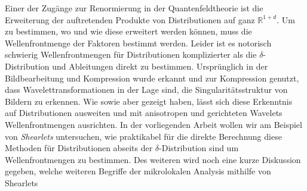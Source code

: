 
Einer der Zugänge zur Renormierung in der Quantenfeldtheorie ist die Erweiterung der auftretenden Produkte von Distributionen auf ganz $\mathbb{R}^{1+d}$. Um zu bestimmen, wo und wie diese erweitert werden können, muss die Wellenfrontmenge der Faktoren bestimmt werden. Leider ist es notorisch schwierig Wellenfrontmengen für Distributionen komplizierter als die $\delta$-Distribution und Ableitungen direkt zu bestimmen.
Ursprünglich in der Bildbearbeitung und Kompression wurde erkannt und zur Kompression genutzt, dass Wavelettransformationen in der Lage sind, die Singularitätsstruktur von Bildern zu erkennen.
Wie \textcite {Kutyniok2008} sowie \textcite
{Candes2005} aber gezeigt haben, lässt sich diese Erkenntnis auf Distributionen ausweiten und mit anisotropen und gerichteten Wavelets Wellenfrontmengen ausrichten. In der vorliegenden Arbeit wollen wir am Beispiel von \emph{Shearlets} untersuchen, wie praktikabel für die direkte Berechnung diese Methoden für Distributionen abseits der $\delta$-Distribution sind um Wellenfrontmengen zu bestimmen. Des weiteren wird noch eine kurze Diskussion gegeben, welche weiteren Begriffe der mikrolokalen Analysis mithilfe von Shearlets
